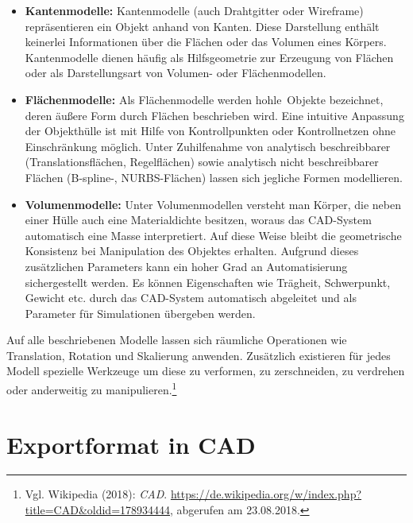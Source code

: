 \begin{itemize}
\item \textbf{Kantenmodelle:} Kantenmodelle (auch Drahtgitter oder Wireframe) repräsentieren ein Objekt anhand von Kanten. Diese Darstellung enthält keinerlei Informationen über die Flächen oder das Volumen eines Körpers. Kantenmodelle dienen häufig als Hilfsgeometrie zur Erzeugung von Flächen oder als Darstellungsart von Volumen- oder Flächenmodellen.

\item \textbf{Flächenmodelle:} Als Flächenmodelle werden \glqq hohle\grqq\ Objekte bezeichnet, deren äußere Form durch Flächen beschrieben wird. Eine intuitive Anpassung der Objekthülle ist mit Hilfe von Kontrollpunkten oder Kontrollnetzen ohne Einschränkung möglich. Unter Zuhilfenahme von analytisch beschreibbarer (Translationsflächen, Regelflächen) sowie analytisch nicht beschreibbarer Flächen (B-spline-, NURBS-Flächen) lassen sich jegliche Formen modellieren.

\item \textbf{Volumenmodelle:} Unter Volumenmodellen versteht man Körper, die neben einer Hülle auch eine Materialdichte besitzen, woraus das CAD-System  automatisch eine Masse interpretiert. Auf diese Weise bleibt die geometrische Konsistenz bei Manipulation des Objektes erhalten. Aufgrund dieses zusätzlichen Parameters kann ein hoher Grad an Automatisierung sichergestellt werden. Es können Eigenschaften wie Trägheit, Schwerpunkt, Gewicht etc. durch das CAD-System automatisch abgeleitet und als Parameter für Simulationen übergeben werden.  
\end{itemize}

Auf alle beschriebenen Modelle lassen sich räumliche Operationen wie Translation, Rotation und Skalierung anwenden. Zusätzlich existieren für jedes Modell spezielle Werkzeuge um diese zu verformen, zu zerschneiden, zu verdrehen oder anderweitig zu manipulieren.\footnote{Vgl. Wikipedia  (2018): \textit{CAD}.\newline
\url{https://de.wikipedia.org/w/index.php?title=CAD&oldid=178934444},\newline 
abgerufen am 23.08.2018.} 

\section{Exportformat in CAD}
\label{sec:ExportformatInCAD}

